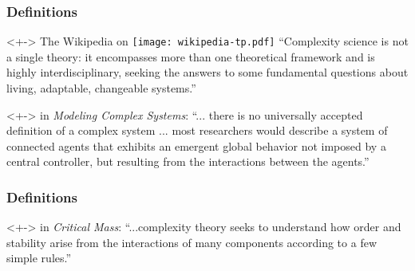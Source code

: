 \begin{frame}
  \frametitle{Definitions}

  \begin{block}<+->{
      The Wikipedia on 
      \hfill \texttt{[image: wikipedia-tp.pdf]} 
    }   
    ``Complexity science is not a single theory: 
    it encompasses more than one theoretical framework and is highly
    interdisciplinary, seeking the answers to some fundamental questions
    about living, adaptable, changeable systems.''
  \end{block}

  \begin{block}<+->{
       in \textit{Modeling Complex Systems}:}\cite{boccara2004a}
    ``... there is no universally accepted definition
    of a complex system ... most researchers would describe
    a system of connected agents that exhibits
    an emergent global behavior not imposed by a central
    controller, but resulting from the interactions between
    the agents.''
  \end{block}


\end{frame}


\begin{frame}
  \frametitle{Definitions}

  \begin{block}<+->{ in \textit{Critical Mass}:}\cite{ball2004a}
    ``...complexity theory seeks to understand how order and 
    stability arise from the interactions of many components
    according to a few simple rules.''
  \end{block}


\end{frame}



